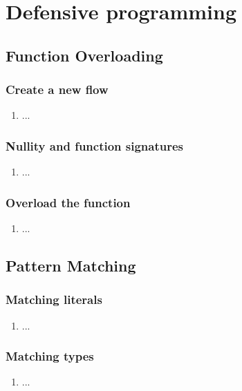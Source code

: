 \chapter{Defensive programming}

\section{Function Overloading}

\subsection{Create a new flow}
\begin{enumerate}
\item ...
\end{enumerate}

\subsection{Nullity and function signatures}
\begin{enumerate}[resume*]
\item ...
\end{enumerate}

\subsection{Overload the function}
\begin{enumerate}[resume*]
\item ...
\end{enumerate}


\section{Pattern Matching}

\subsection{Matching literals}
\begin{enumerate}
\item ...
\end{enumerate}

\subsection{Matching types}
\begin{enumerate}[resume*]
\item ...
\end{enumerate}

